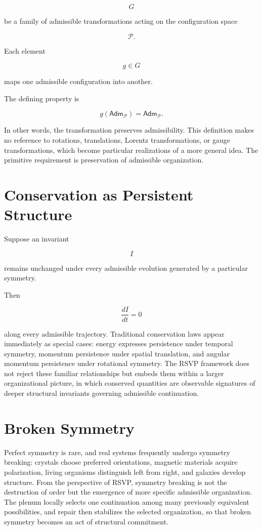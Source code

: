 \documentclass[11pt,oneside]{book}
\numberwithin{equation}{chapter}
\theoremstyle{definition}
\theoremstyle{plain}
\newcommand{\Adm}{\mathsf{Adm}}
\begin{document}
\[
G
\]

be a family of admissible transformations acting on the configuration space

\[
\mathcal P.
\]

Each element

\[
g\in G
\]

maps one admissible configuration into another.

The defining property is

\[
g(\Adm_{\mathcal P})
=
\Adm_{\mathcal P}.
\]

In other words, the transformation preserves admissibility. This definition makes no reference to rotations, translations, Lorentz transformations, or gauge transformations, which become particular realizations of a more general idea. The primitive requirement is preservation of admissible organization.

\section{Conservation as Persistent Structure}

Suppose an invariant

\[
I
\]

remains unchanged under every admissible evolution generated by a particular
symmetry.

Then

\[
\frac{dI}{dt}=0
\]

along every admissible trajectory. Traditional conservation laws appear immediately as special cases: energy expresses persistence under temporal symmetry, momentum persistence under spatial translation, and angular momentum persistence under rotational symmetry. The RSVP framework does not reject these familiar relationships but embeds them within a larger organizational picture, in which conserved quantities are observable signatures of deeper structural invariants governing admissible continuation.

\section{Broken Symmetry}

Perfect symmetry is rare, and real systems frequently undergo symmetry breaking: crystals choose preferred orientations, magnetic materials acquire polarization, living organisms distinguish left from right, and galaxies develop structure. From the perspective of RSVP, symmetry breaking is not the destruction of order but the emergence of more specific admissible organization. The plenum locally selects one continuation among many previously equivalent possibilities, and repair then stabilizes the selected organization, so that broken symmetry becomes an act of structural commitment.
\end{document}
